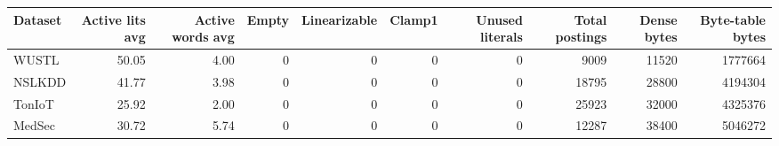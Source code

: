 \begin{tabular}{lrrrrrrrrr}
\toprule
Dataset & Active lits avg & Active words avg & Empty & Linearizable & Clamp1 & Unused literals & Total postings & Dense bytes & Byte-table bytes \\
\midrule
WUSTL & 50.05 & 4.00 & 0 & 0 & 0 & 0 & 9009 & 11520 & 1777664 \\
NSLKDD & 41.77 & 3.98 & 0 & 0 & 0 & 0 & 18795 & 28800 & 4194304 \\
TonIoT & 25.92 & 2.00 & 0 & 0 & 0 & 0 & 25923 & 32000 & 4325376 \\
MedSec & 30.72 & 5.74 & 0 & 0 & 0 & 0 & 12287 & 38400 & 5046272 \\
\bottomrule
\end{tabular}
